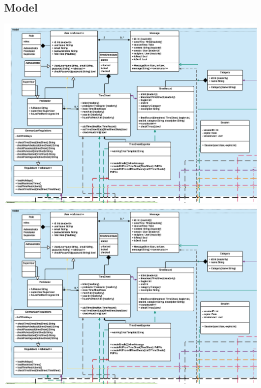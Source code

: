     \subsection{Model}
        \includegraphics[width=\linewidth,page=1]{Diagramms/class/model.pdf}\\
        \includegraphics[width=\linewidth,page=2]{Diagramms/class/model.pdf}\\
        \newpage
